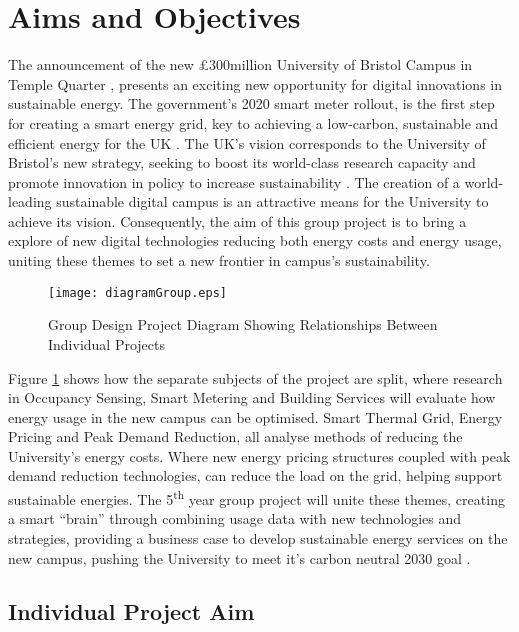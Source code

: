\section{Aims and Objectives}\label{aims-and-objectives}

The announcement of the new £300million University of Bristol Campus in
Temple Quarter \cite{November58:online}, presents an exciting new
opportunity for digital innovations in sustainable energy. The
government's 2020 smart meter rollout, is the first step for creating a
smart energy grid, key to achieving a low-carbon, sustainable and
efficient energy for the UK \cite{SmartEne79:online}. The UK's vision
corresponds to the University of Bristol's new strategy, seeking to
boost its world-class research capacity and promote innovation in policy
to increase sustainability \cite{universi93:online}. The creation of a
world-leading sustainable digital campus is an attractive means for the
University to achieve its vision. Consequently, the aim of this group
project is to bring a explore of new digital technologies reducing both
energy costs and energy usage, uniting these themes to set a new
frontier in campus's sustainability.

\begin{figure}[H]
\centering
\texttt{[image: diagramGroup.eps]}
\caption{Group Design Project Diagram Showing Relationships Between Individual Projects}
\vspace{-20pt}
\label{groupDia}
\end{figure}

Figure \ref{groupDia} shows how the separate subjects of the project are
split, where research in Occupancy Sensing, Smart Metering and Building
Services will evaluate how energy usage in the new campus can be
optimised. Smart Thermal Grid, Energy Pricing and Peak Demand Reduction,
all analyse methods of reducing the University's energy costs. Where new
energy pricing structures coupled with peak demand reduction
technologies, can reduce the load on the grid, helping support
sustainable energies. The 5\textsuperscript{th} year group project will
unite these themes, creating a smart ``brain'' through combining usage
data with new technologies and strategies, providing a business case to
develop sustainable energy services on the new campus, pushing the
University to meet it's carbon neutral 2030 goal
\cite{universi93:online}.

\subsection{Individual Project Aim}\label{individual-project-aim}


